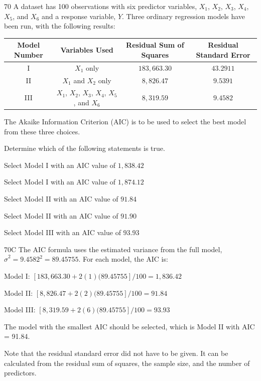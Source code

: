 \begin{question}{70}
A dataset has 100 observations with six predictor variables, $X_1$, $X_2$, $X_3$, $X_4$, $X_5$, and $X_6$ and a response variable, $Y$. Three ordinary regression models have been run, with the following results:
\begin{center}
\begin{tabular}{|c|c|c|c|}
\hline
Model Number & Variables Used & Residual Sum of Squares & Residual Standard Error \\ \hline
I & $X_1$ only & $183{,}663.30$ & $43.2911$ \\ \hline
II & $X_1$ and $X_2$ only & $8{,}826.47$ & $9.5391$ \\ \hline
III & $X_1$, $X_2$, $X_3$, $X_4$, $X_5$, and $X_6$ & $8{,}319.59$ & $9.4582$ \\ \hline
\end{tabular}
\end{center}

The Akaike Information Criterion (AIC) is to be used to select the best model from these three choices.

Determine which of the following statements is true.

\begin{choices}
\item Select Model I with an AIC value of $1{,}838.42$
\item Select Model I with an AIC value of $1{,}874.12$
\item Select Model II with an AIC value of $91.84$
\item Select Model II with an AIC value of $91.90$
\item Select Model III with an AIC value of $93.93$
\end{choices}
\end{question}
\begin{solution}{70}{C}
The AIC formula uses the estimated variance from the full model, $\hat{\sigma}^2 = 9.4582^2 = 89.45755$. For each model, the AIC is:

Model I: $[183{,}663.30 + 2(1)(89.45755]/100 = 1{,}836.42$

Model II: $[8{,}826.47 + 2(2)(89.45755]/100 = 91.84$

Model III: $[8{,}319.59 + 2(6)(89.45755]/100 = 93.93$

The model with the smallest AIC should be selected, which is Model II with AIC = 91.84.

Note that the residual standard error did not have to be given. It can be calculated from the residual sum of squares, the sample size, and the number of predictors.
\end{solution}

